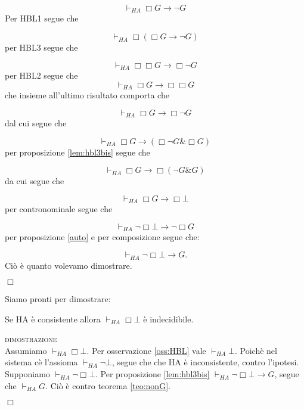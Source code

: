 	$$\vdash_{HA}\Box G \rightarrow \neg G$$
	Per HBL1 segue che
	
	$$\vdash_{HA}\Box(\Box G \rightarrow\neg G)$$
	per HBL3 segue che

	$$\vdash_{HA}\Box\Box G \rightarrow \Box\neg G$$
	per HBL2 segue che
	$$\vdash_{HA} \Box G \rightarrow \Box\Box G$$
	che insieme all'ultimo risultato comporta che

	$$\vdash_{HA} \Box G \rightarrow \Box\neg G$$
	dal cui segue che

	$$\vdash_{HA} \Box G \rightarrow (\Box\neg G \& \Box G)$$
	per proposizione \ref{lem:hbl3bis} segue che
	
	$$\vdash_{HA} \Box G \rightarrow \Box(\neg G \& G)$$
	da cui segue che
	
	$$\vdash_{HA} \Box G \rightarrow \Box\bot$$
	per contronominale segue che
	
	$$\vdash_{HA} \neg\Box\bot \rightarrow \neg\Box G$$
	per proposizione \ref{auto} e per composizione segue che:

	$$\vdash_{HA} \neg\Box\bot \rightarrow G.$$
	Ci\`o \`e quanto volevamo dimostrare.
	\begin{flushright}$\Box$\end{flushright}

	Siamo pronti per dimostrare:

	\begin{thm}
	\label{teo:inc1}
	Se HA \`e consistente allora $\vdash_{HA}\Box\bot$ \`e indecidibile.
	\end{thm}
	
	\textsc{dimostrazione}\\
 	Assumiamo $\vdash_{HA}\Box\bot$. Per osservazione
 	\ref{oss:HBL} vale $\vdash_{HA}\bot$.
	Poich\`e nel sistema c\`e l'assioma $\vdash_{HA}\neg\bot$,
	segue che che HA \`e inconsistente, contro l'ipotesi.
 	Supponiamo $\vdash_{HA}\neg\Box\bot$.
	Per proposizione \ref{lem:hbl3bis} $\vdash_{HA}\neg\Box\bot\rightarrow G$,
	segue che $\vdash_{HA} G$. Ci\`o \`e contro teorema \ref{teo:nonG}.
	\begin{flushright}$\Box$\end{flushright}

